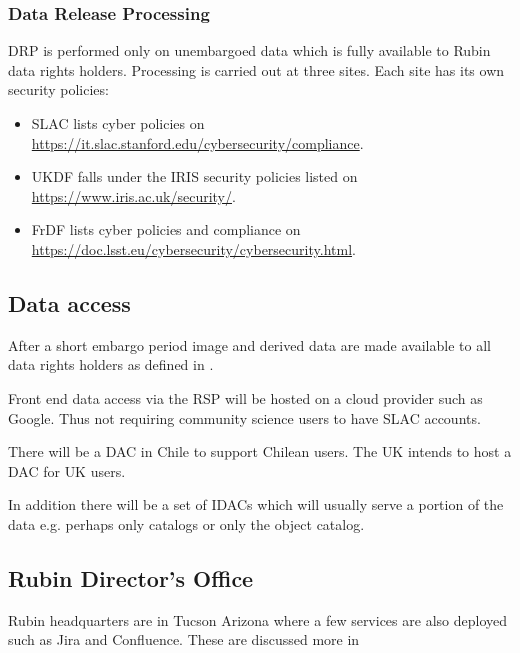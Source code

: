 \subsubsection{Data Release Processing}
DRP is performed only on unembargoed data which is fully available to Rubin data rights holders.
Processing is carried out at three sites.
Each site has its own security policies:

\begin{itemize}
\item SLAC lists cyber policies on \url{https://it.slac.stanford.edu/cybersecurity/compliance}.
\item UKDF falls under the \gls{IRIS} security policies listed on \url{https://www.iris.ac.uk/security/}.
\item FrDF lists cyber policies and compliance on \url{https://doc.lsst.eu/cybersecurity/cybersecurity.html}.
\end{itemize}



\subsection{Data access}
After a short embargo period image and derived data are made available to all
data rights holders as defined in .

Front end data access via the \gls{RSP} will be hosted on a \gls{cloud} provider such as Google.
Thus not requiring community science users to have \gls{SLAC} accounts.

There will  be a \gls{DAC} in Chile to support Chilean users.
The \gls{UK} intends to host a DAC for \gls{UK} users.

In addition there will be a set of \gls{IDAC}s which will usually serve a portion of the data e.g. perhaps only catalogs or only the object catalog.


\subsection{Rubin \gls{Director}'s Office}
Rubin headquarters are in Tucson Arizona where a few services are also deployed such as Jira and Confluence.
These are discussed more in 


